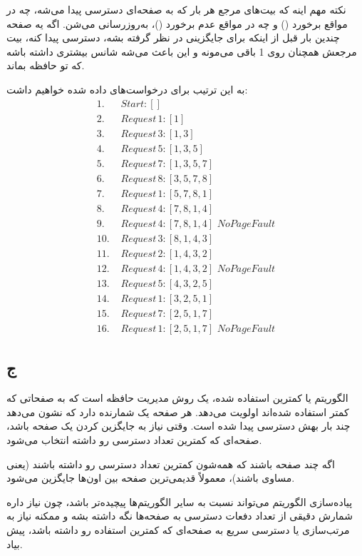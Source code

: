 نکته مهم اینه که بیت‌های مرجع هر بار که به صفحه‌ای دسترسی پیدا می‌شه، چه در مواقع برخورد () و چه در مواقع عدم برخورد ()، به‌روزرسانی می‌شن. اگه یه صفحه چندین بار قبل از اینکه برای جایگزینی در نظر گرفته بشه، دسترسی پیدا کنه، بیت مرجعش همچنان روی 1 باقی می‌مونه و این باعث می‌شه شانس بیشتری داشته باشه که تو حافظه بماند.

به این ترتیب برای درخواست‌های داده شده خواهیم داشت:
\begin{align*}
1.\,\,  &Start: [] \\
2.\,\,  &Request\, 1: [1] \\
3.\,\,  &Request\, 3: [1, 3] \\
4.\,\,  &Request\, 5: [1, 3, 5] \\
5.\,\,  &Request\, 7: [1, 3, 5, 7] \\
6.\,\,  &Request\, 8: [3, 5, 7, 8] \\
7.\,\,  &Request\, 1: [5, 7, 8, 1] \\
8.\,\,  &Request\, 4: [7, 8, 1, 4] \\
9.\,\,  &Request\, 4: [7, 8, 1, 4] \,\, No Page Fault \\
10.\,\, &Request\, 3: [8, 1, 4, 3] \\
11.\,\, &Request\, 2: [1, 4, 3, 2] \\
12.\,\, &Request\, 4: [1, 4, 3, 2] \,\, No Page Fault \\
13.\,\, &Request\, 5: [4, 3, 2, 5] \\
14.\,\, &Request\, 1: [3, 2, 5, 1] \\
15.\,\, &Request\, 7: [2, 5, 1, 7] \\
16.\,\, &Request\, 1: [2, 5, 1, 7] \,\, No Page Fault
\end{align*}

\subsection*{ج}
الگوریتم  یا کمترین استفاده شده، یک روش مدیریت حافظه است که به صفحاتی که کمتر استفاده شده‌اند اولویت می‌دهد. هر صفحه یک شمارنده دارد که نشون می‌دهد چند بار بهش دسترسی پیدا شده است. وقتی نیاز به جایگزین کردن یک صفحه باشد، صفحه‌ای که کمترین تعداد دسترسی رو داشته انتخاب می‌شود.

اگه چند صفحه باشند که همه‌شون کمترین تعداد دسترسی رو داشته باشند (یعنی مساوی باشند)، معمولاً قدیمی‌ترین صفحه بین اون‌ها جایگزین می‌شود. 

پیاده‌سازی الگوریتم  می‌تواند نسبت به سایر الگوریتم‌ها پیچیده‌تر باشد، چون نیاز داره شمارش دقیقی از تعداد دفعات دسترسی به صفحه‌ها نگه داشته بشه و ممکنه نیاز به مرتب‌سازی یا دسترسی سریع به صفحه‌ای که کمترین استفاده رو داشته باشد، پیش بیاد. 

